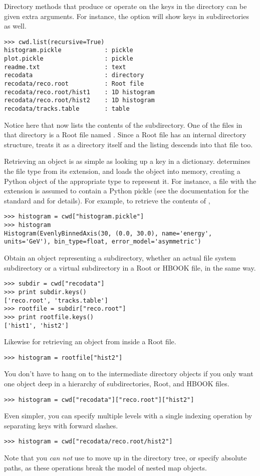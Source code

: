 Directory methods that produce or operate on the keys in the directory
can be given extra arguments.  For instance, the  option
will show keys in subdirectories as well.
\begin{verbatim}
>>> cwd.list(recursive=True)
histogram.pickle            : pickle
plot.pickle                 : pickle
readme.txt                  : text
recodata                    : directory
recodata/reco.root          : Root file
recodata/reco.root/hist1    : 1D histogram
recodata/reco.root/hist2    : 1D histogram
recodata/tracks.table       : table
\end{verbatim}
Notice here that  now lists the contents of the
 subdirectory.  One of the files in that directory is a
Root file named .  Since a Root file has an internal
directory structure, \pyhep treats it as a directory itself and the
listing descends into that file too.

Retrieving an object is as simple as looking up a key in a dictionary.
\pyhep determines the file type from its extension, and loads the object
into memory, creating a Python object of the appropriate type to
represent it.  For instance, a file with the extension  is
assumed to contain a Python pickle (see the documentation for the
standard  and  for details).  For
example, to retrieve the contents of ,
\begin{verbatim}
>>> histogram = cwd["histogram.pickle"]
>>> histogram
Histogram(EvenlyBinnedAxis(30, (0.0, 30.0), name='energy', units='GeV'), bin_type=float, error_model='asymmetric')
\end{verbatim}

Obtain an object representing a subdirectory, whether an actual file
system subdirectory or a virtual subdirectory in a Root or HBOOK file,
in the same way.
\begin{verbatim}
>>> subdir = cwd["recodata"]
>>> print subdir.keys()
['reco.root', 'tracks.table']
>>> rootfile = subdir["reco.root"]
>>> print rootfile.keys()
['hist1', 'hist2']
\end{verbatim}
Likewise for retrieving an object from inside a Root file.
\begin{verbatim}
>>> histogram = rootfile["hist2"]
\end{verbatim}

You don't have to hang on to the intermediate directory objects if you
only want one object deep in a hierarchy of subdirectories, Root, and
HBOOK files.
\begin{verbatim}
>>> histogram = cwd["recodata"]["reco.root"]["hist2"]
\end{verbatim}
Even simpler, you can specify multiple levels with a single indexing
operation by separating keys with forward slashes.
\begin{verbatim}
>>> histogram = cwd["recodata/reco.root/hist2"]
\end{verbatim}
Note that you \emph{can not} use  to move up in the directory
tree, or specify absolute paths, as these operations break the model of
nested map objects.

